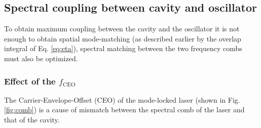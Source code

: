 \subsection{Spectral coupling between cavity and oscillator}

To obtain maximum coupling between the cavity and the oscillator it is not enough to obtain spatial mode-matching (as described earlier by the overlap integral of Eq. \ref{eq:eta}), spectral matching between the two frequency combs must also be optimized.

\subsubsection{Effect of the $f_\mathrm{CEO}$}
The Carrier-Envelope-Offset (CEO) of the mode-locked laser (shown in Fig. \ref{fig:comb}) is a cause of mismatch between the spectral comb of the laser and that of the cavity.

